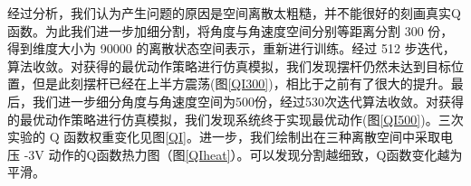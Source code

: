 \documentclass[conference,10pt]{IEEEtran}
\begin{document}
经过分析，我们认为产生问题的原因是空间离散太粗糙，并不能很好的刻画真实Q函数。为此我们进一步加细分割，将角度与角速度空间分别等距离分割 300 份，得到维度大小为 90000 的离散状态空间表示，重新进行训练。经过 512 步迭代，算法收敛。对获得的最优动作策略进行仿真模拟，我们发现摆杆仍然未达到目标位置，但是此刻摆杆已经在上半方震荡(图\ref{QI300})，相比于之前有了很大的提升。最后，我们进一步细分角度与角速度空间为500份，经过530次迭代算法收敛。对获得的最优动作策略进行仿真模拟，我们发现系统终于实现最优动作(图\ref{QI500})。三次实验的 Q 函数权重变化见图\ref{QI}。进一步，我们绘制出在三种离散空间中采取电压 -3V 动作的Q函数热力图（图\ref{QIheat}）。可以发现分割越细致，Q函数变化越为平滑。
\begin{figure}[H]
	\centering
	\centering
\end{figure}
\end{document}
